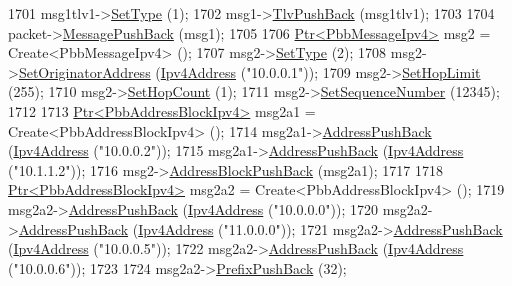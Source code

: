 \begin{DoxyCode}
1701     msg1tlv1->\hyperlink{classns3_1_1PbbTlv_a90a0452018ed364ac37c3ad116dd718b}{SetType} (1);
1702     msg1->\hyperlink{classns3_1_1PbbMessage_aac70b2672f79765cf5cc5b6666018165}{TlvPushBack} (msg1tlv1);
1703 
1704     packet->\hyperlink{classns3_1_1PbbPacket_a4a3170001ef758d9c9c4375b8f089826}{MessagePushBack} (msg1);
1705 
1706     \hyperlink{classns3_1_1Ptr}{Ptr<PbbMessageIpv4>} msg2 = Create<PbbMessageIpv4> ();
1707     msg2->\hyperlink{classns3_1_1PbbMessage_a4b3d1eaabd3e7412a46ac79bf3360dac}{SetType} (2);
1708     msg2->\hyperlink{classns3_1_1PbbMessage_a52ac135a2bec53db5e8f46b8b8a25e7c}{SetOriginatorAddress} (\hyperlink{classns3_1_1Ipv4Address}{Ipv4Address} (\textcolor{stringliteral}{"10.0.0.1"}));
1709     msg2->\hyperlink{classns3_1_1PbbMessage_a532a7e5e135f7491f8a84ab1dfadd28f}{SetHopLimit} (255);
1710     msg2->\hyperlink{classns3_1_1PbbMessage_a882ec7e2e9a9dff6297152c196d54ce4}{SetHopCount} (1);
1711     msg2->\hyperlink{classns3_1_1PbbMessage_a8c24696ac67507afa03c9750daccc47d}{SetSequenceNumber} (12345);
1712 
1713     \hyperlink{classns3_1_1Ptr}{Ptr<PbbAddressBlockIpv4>} msg2a1 = Create<PbbAddressBlockIpv4> ();
1714     msg2a1->\hyperlink{classns3_1_1PbbAddressBlock_a7be545a53d69bd426dbebcf752ed8371}{AddressPushBack} (\hyperlink{classns3_1_1Ipv4Address}{Ipv4Address} (\textcolor{stringliteral}{"10.0.0.2"}));
1715     msg2a1->\hyperlink{classns3_1_1PbbAddressBlock_a7be545a53d69bd426dbebcf752ed8371}{AddressPushBack} (\hyperlink{classns3_1_1Ipv4Address}{Ipv4Address} (\textcolor{stringliteral}{"10.1.1.2"}));
1716     msg2->\hyperlink{classns3_1_1PbbMessage_a5f623bad2fb1adde7da885e1c92d5311}{AddressBlockPushBack} (msg2a1);
1717 
1718     \hyperlink{classns3_1_1Ptr}{Ptr<PbbAddressBlockIpv4>} msg2a2 = Create<PbbAddressBlockIpv4> ();
1719     msg2a2->\hyperlink{classns3_1_1PbbAddressBlock_a7be545a53d69bd426dbebcf752ed8371}{AddressPushBack} (\hyperlink{classns3_1_1Ipv4Address}{Ipv4Address} (\textcolor{stringliteral}{"10.0.0.0"}));
1720     msg2a2->\hyperlink{classns3_1_1PbbAddressBlock_a7be545a53d69bd426dbebcf752ed8371}{AddressPushBack} (\hyperlink{classns3_1_1Ipv4Address}{Ipv4Address} (\textcolor{stringliteral}{"11.0.0.0"}));
1721     msg2a2->\hyperlink{classns3_1_1PbbAddressBlock_a7be545a53d69bd426dbebcf752ed8371}{AddressPushBack} (\hyperlink{classns3_1_1Ipv4Address}{Ipv4Address} (\textcolor{stringliteral}{"10.0.0.5"}));
1722     msg2a2->\hyperlink{classns3_1_1PbbAddressBlock_a7be545a53d69bd426dbebcf752ed8371}{AddressPushBack} (\hyperlink{classns3_1_1Ipv4Address}{Ipv4Address} (\textcolor{stringliteral}{"10.0.0.6"}));
1723 
1724     msg2a2->\hyperlink{classns3_1_1PbbAddressBlock_a8e6f539ccffd043a2890396d882d0a42}{PrefixPushBack} (32);

\end{DoxyCode}
